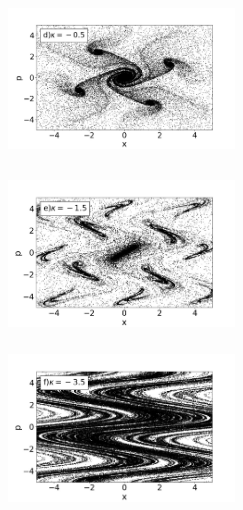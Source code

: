 \documentclass[letterpaper,12pt,oneside]{book}
\begin{document}
\begin{figure}[h!]
\begin{minipage}{0.32\textwidth}
	\end{minipage}\\
	\begin{minipage}{0.32\textwidth}
		
		\includegraphics[width=6cm,height=4.5cm]{FigsJPG/PhaseSpace_dd}
	\end{minipage}
	\begin{minipage}{0.32\textwidth}
		\includegraphics[width=6cm,height=4.5cm]{FigsJPG/PhaseSpace_ee}
	\end{minipage}
	\begin{minipage}{0.32\textwidth}
		\includegraphics[width=6cm,height=4.5cm]{FigsJPG/PhaseSpace_ff}
		
	\end{minipage}\\
	\begin{minipage}{0.32\textwidth}
		

\end{minipage}
\end{figure}
\end{document}
